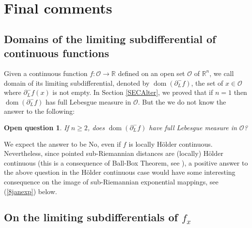 \documentclass[JEP,XML,SOM,Unicode,NoFloatCountersInSection,published]{cedram}
\DeclareMathOperator{\dom}{dom}
\newcommand\R{\mathbb R}
\newtheorem*{OQ*}{Open question}
\theoremstyle{definition}
\begin{document}
\section{Final comments}\label{SECComments}

\subsection{Domains of the limiting subdifferential of continuous functions}\label{SEC8jan}

Given a continuous function $f:\mathcal{O} \to \R$ defined on an open set $\mathcal{O}$ of $\R^n$, we call domain of its limiting subdifferential, denoted by $\dom (\partial^-_L f)$, the set of $x\in \mathcal{O}$ where $\partial^-_Lf(x)$ is not empty. In Section \ref{SECAlter}, we proved that if $n=1$ then $\dom (\partial^-_L f)$ has full Lebesgue measure in $\mathcal{O}$. But the we do not know the answer to the following:

\begin{OQ*}
If $n\geq 2$, does $\dom (\partial^-_L f)$ have full Lebesgue measure in $\mathcal{O}$?
\end{OQ*}

We expect the answer to be No, even if $f$ is locally Hölder continuous. Nevertheless, since pointed sub-Riemannian distances are (locally) Hölder continuous (this is a consequence of Ball-Box Theorem, see \eg \cite{abb17,bellaiche96,montgomery02}), a positive answer to the above question in the Hölder continuous case would have some interesting consequence on the image of sub-Riemannian exponential mappings, see (\ref{8janexp}) below.

\subsection{On the limiting subdifferentials of $f_x$}\label{SEClimitingmin}
\end{document}
